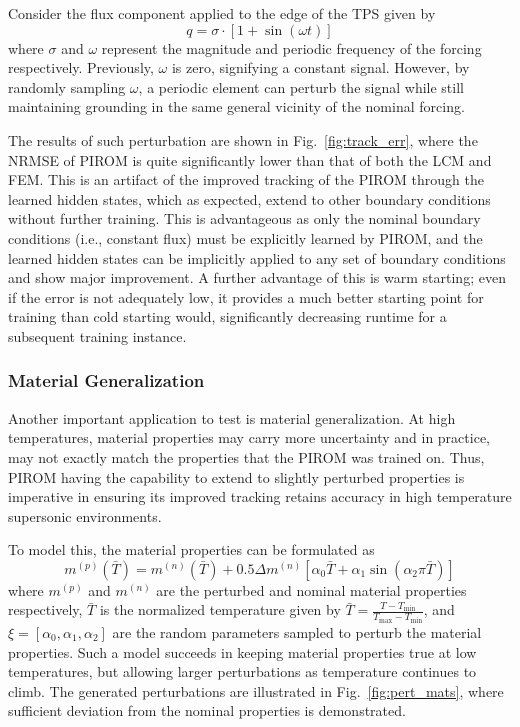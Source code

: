 Consider the flux component applied to the edge of the TPS given by
\begin{equation}
    q = \sigma \cdot \left[1+\sin(\omega t)\right]
\end{equation}
where $\sigma$ and $\omega$ represent the magnitude and periodic frequency of the forcing respectively. Previously, $\omega$ is zero, signifying a constant signal. However, by randomly sampling $\omega$, a periodic element can perturb the signal while still maintaining grounding in the same general vicinity of the nominal forcing. 

The results of such perturbation are shown in Fig.~\ref{fig:track_err}, where the NRMSE of PIROM is quite significantly lower than that of both the LCM and FEM. This is an artifact of the improved tracking of the PIROM through the learned hidden states, which as expected, extend to other boundary conditions without further training. This is advantageous as only the nominal boundary conditions (i.e., constant flux) must be explicitly learned by PIROM, and the learned hidden states can be implicitly applied to any set of boundary conditions and show major improvement. A further advantage of this is warm starting; even if the error is not adequately low, it provides a much better starting point for training than cold starting would, significantly decreasing runtime for a subsequent training instance. 

\subsubsection{Material Generalization}

Another important application to test is material generalization. At high temperatures, material properties may carry more uncertainty and in practice, may not exactly match the properties that the PIROM was trained on. Thus, PIROM having the capability to extend to slightly perturbed properties is imperative in ensuring its improved tracking retains accuracy in high temperature supersonic environments. 

To model this, the material properties can be formulated as
\begin{equation}
    m^{(p)} (\bar{T}) = m^{(n)}(\bar{T}) + 0.5\Delta m^{(n)}\left[ \alpha_0 \bar{T} + \alpha_1 \sin(\alpha_2 \pi \bar{T})\right]
\end{equation}
where $m^{(p)}$ and $m^{(n)}$ are the perturbed and nominal material properties respectively, $\bar{T}$ is the normalized temperature given by $\bar{T} = \frac{T - T_\text{min}}{T_\text{max}-T_\text{min} }$, and $\xi = [\alpha_0, \alpha_1, \alpha_2]$ are the random parameters sampled to perturb the material properties.
Such a model succeeds in keeping material properties true at low temperatures, but allowing larger perturbations as temperature continues to climb. The generated perturbations are illustrated in Fig.~\ref{fig:pert_mats}, where sufficient deviation from the nominal properties is demonstrated. 

